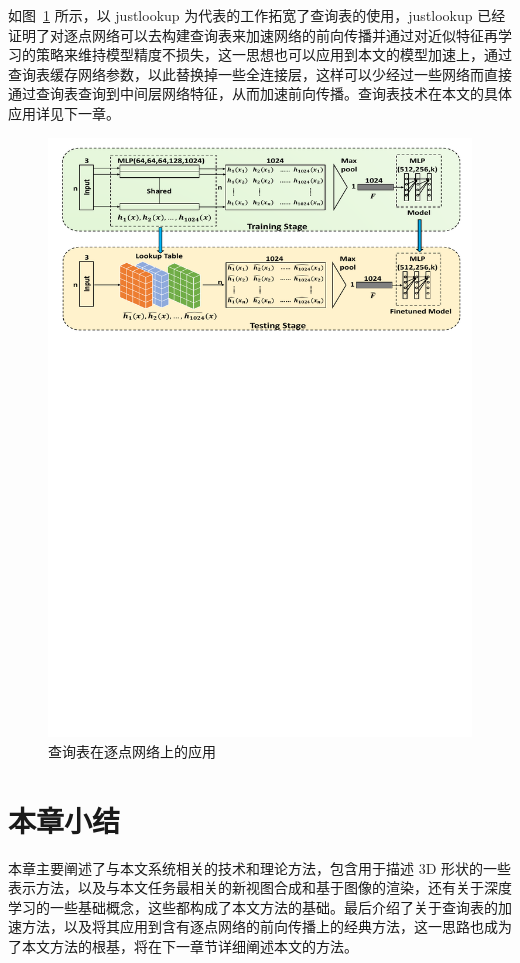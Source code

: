 如图~\ref{fig:justlookup} 所示，以 justlookup\cite{lin2019justlookup} 为代表的工作拓宽了查询表的使用，justlookup 已经证明了对逐点网络可以去构建查询表来加速网络的前向传播并通过对近似特征再学习的策略来维持模型精度不损失，这一思想也可以应用到本文的模型加速上，通过查询表缓存网络参数，以此替换掉一些全连接层，这样可以少经过一些网络而直接通过查询表查询到中间层网络特征，从而加速前向传播。查询表技术在本文的具体应用详见下一章。

\begin{figure}[t]
    \centering
    \includegraphics[width=0.9\linewidth]{figures/justlookup.pdf}
    \caption{查询表在逐点网络上的应用\cite{lin2019justlookup}}
    \label{fig:justlookup}
\end{figure}


\section{本章小结}
本章主要阐述了与本文系统相关的技术和理论方法，包含用于描述 3D 形状的一些表示方法，以及与本文任务最相关的新视图合成和基于图像的渲染，还有关于深度学习的一些基础概念，这些都构成了本文方法的基础。最后介绍了关于查询表的加速方法，以及将其应用到含有逐点网络的前向传播上的经典方法，这一思路也成为了本文方法的根基，将在下一章节详细阐述本文的方法。
